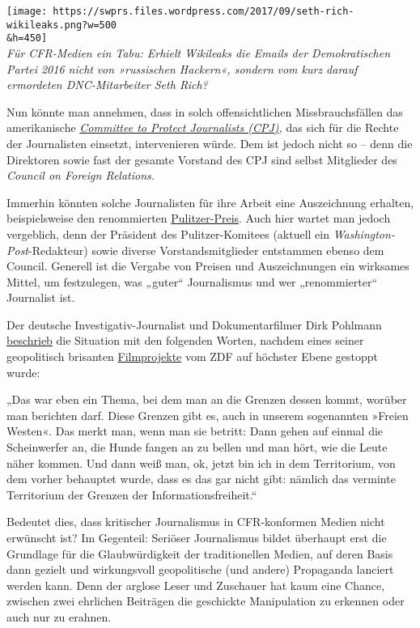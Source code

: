 \texttt{[image: https://swprs.files.wordpress.com/2017/09/seth-rich-wikileaks.png?w=500\\\&h=450]}\\
\emph{Für CFR-Medien ein Tabu: Erhielt Wikileaks die Emails der
Demokratischen Partei 2016 nicht} \emph{von »russischen Hackern«,
sondern} \emph{vom kurz darauf ermordeten DNC-Mitarbeiter Seth Rich?}

Nun könnte man annehmen, dass in solch offensichtlichen
Missbrauchs­fällen das amerikanische
\emph{\href{https://en.wikipedia.org/wiki/Committee_to_Protect_Journalists}{Committee
to Protect Journalists (CPJ)},} das sich für die Rechte der Journalisten
einsetzt, intervenieren würde. Dem ist jedoch nicht so -- denn die
Direktoren sowie fast der gesamte Vorstand des CPJ sind selbst
Mitglieder des \emph{Council on Foreign Relations.}

Immerhin könnten solche Journalisten für ihre Arbeit eine Auszeichnung
erhalten, beispiels­weise den renommierten
\href{https://en.wikipedia.org/wiki/Pulitzer_Prize}{Pulitzer-Preis}.
Auch hier wartet man jedoch vergeblich, denn der Präsident des
Pulitzer-Komitees (aktuell ein \emph{Washington-Post}-Redakteur) sowie
diverse Vorstands­mitglieder entstammen ebenso dem Council. Generell ist
die Vergabe von Preisen und Auszeichnungen ein wirksames Mittel, um
festzulegen, was „guter`` Journalismus und wer „renommierter``
Journalist ist.

Der deutsche Investigativ-Journalist und Dokumentar­filmer Dirk Pohlmann
\href{https://youtu.be/mJrA1lnMcv8?t=5m24s}{beschrieb} die Situation mit
den folgenden Worten, nachdem eines seiner geopolitisch brisanten
\href{http://www.imdb.com/name/nm0688383/}{Filmprojekte} vom ZDF auf
höchster Ebene gestoppt wurde:

„Das war eben ein Thema, bei dem man an die Grenzen dessen kommt,
worüber man berichten darf. Diese Grenzen gibt es, auch in unserem
sogenannten »Freien Westen«. Das merkt man, wenn man sie betritt: Dann
gehen auf einmal die Scheinwerfer an, die Hunde fangen an zu bellen und
man hört, wie die Leute näher kommen. Und dann weiß man, ok, jetzt bin
ich in dem Territorium, von dem vorher behauptet wurde, dass es das gar
nicht gibt: nämlich das verminte Territorium der Grenzen der
Informationsfreiheit.``

Bedeutet dies, dass kritischer Journalismus in CFR-konformen Medien
nicht erwünscht ist? Im Gegenteil: Seriöser Journalismus bildet
überhaupt erst die Grundlage für die Glaubwürdigkeit der traditionellen
Medien, auf deren Basis dann gezielt und wirkungsvoll geopolitische (und
andere) Propaganda lanciert werden kann. Denn der arglose Leser und
Zuschauer hat kaum eine Chance, zwischen zwei ehrlichen Beiträgen die
geschickte Manipulation zu erkennen oder auch nur zu erahnen.

